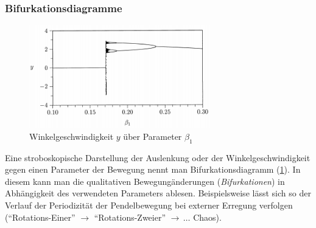 \documentclass[numbers=noenddot,12pt,a4paper]{scrartcl}
\newcommand{\tilt}[1]{\textit{#1}}
\begin{document}
\subsubsection{Bifurkationsdiagramme}
\begin{figure}[h]
\centering
\includegraphics[width=0.7\textwidth]{bifur.png}
\caption{Winkelgeschwindigkeit $y$ über Parameter $\beta_1$} \label{img:bifur}
\end{figure}
Eine stroboskopische Darstellung der Auslenkung oder der Winkelgeschwindigkeit gegen einen Parameter der Bewegung nennt man Bifurkationsdiagramm (\ref{img:bifur}). In diesem kann man die qualitativen Bewegung\"anderungen (\tilt{Bifurkationen}) in Abh\"angigkeit des verwendeten Parameters ablesen. Beispielsweise l\"asst sich so der Verlauf der Periodizit\"at der Pendelbewegung bei externer Erregung verfolgen (``Rotations-Einer'' $\rightarrow$ ``Rotations-Zweier'' $\rightarrow \, \dots$ Chaos).
\end{document}
